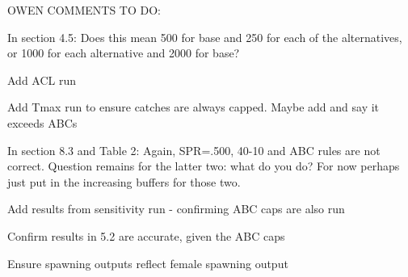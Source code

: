 \documentclass[11pt,
  english,
  a4paper,
]{article}
\begin{document}
\leavevmode\tagmcend\tagstructend\par


OWEN COMMENTS TO DO:

\leavevmode\tagmcend\tagstructend\par


In section 4.5: Does this mean 500 for base and 250 for each of the alternatives, or 1000 for each alternative and 2000 for base?

\leavevmode\tagmcend\tagstructend\par


Add ACL run

\leavevmode\tagmcend\tagstructend\par


Add Tmax run to ensure catches are always capped. Maybe add and say it exceeds ABCs

\leavevmode\tagmcend\tagstructend\par


In section 8.3 and Table 2: Again, SPR=.500, 40-10 and ABC rules are not correct. Question remains for the latter two: what do you do? For now perhaps just put in the increasing buffers for those two.

\leavevmode\tagmcend\tagstructend\par


Add results from sensitivity run - confirming ABC caps are also run

\leavevmode\tagmcend\tagstructend\par


Confirm results in 5.2 are accurate, given the ABC caps

\leavevmode\tagmcend\tagstructend\par


Ensure spawning outputs reflect female spawning output

\leavevmode\tagmcend\tagstructend\par
\end{document}
